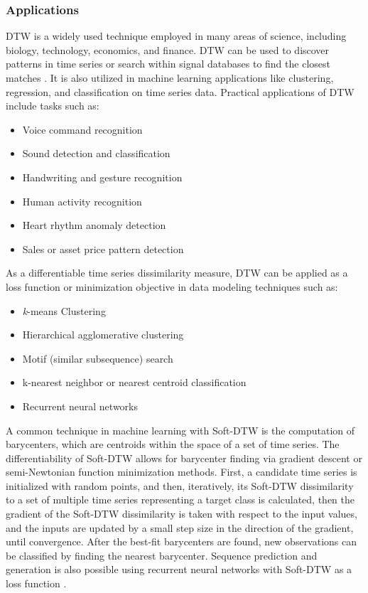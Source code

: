 \documentclass[12pt, letterpaper]{article}
\begin{document}
\subsubsection{Applications}

DTW is a widely used technique employed in many areas of science, including
biology, technology, economics, and finance. DTW can be used to discover
patterns in time series or search within signal databases to find the closest
matches \cite{keogh_derivative_2001}. It is also utilized in machine learning
applications like clustering, regression, and classification on time series
data. Practical applications of DTW include tasks such as:

\begin{itemize}
    \item Voice command recognition
    \item Sound detection and classification
    \item Handwriting and gesture recognition
    \item Human activity recognition
    \item Heart rhythm anomaly detection
    \item Sales or asset price pattern detection
\end{itemize}

As a differentiable time series dissimilarity measure, DTW can be applied as a
loss function or minimization objective in data modeling techniques such as:

\begin{itemize}
  \item \emph{k}-means Clustering
  \item Hierarchical agglomerative clustering
  \item Motif (similar subsequence) search
  \item k-nearest neighbor or nearest centroid classification
  \item Recurrent neural networks
\end{itemize}

A common technique in machine learning with Soft-DTW is the computation of
barycenters, which are centroids within the space of a set of time series. The
differentiability of Soft-DTW allows for barycenter finding via gradient descent
or semi-Newtonian function minimization methods. First, a candidate time series
is initialized with random points, and then, iteratively, its Soft-DTW
dissimilarity to a set of multiple time series representing a target class is
calculated, then the gradient of the Soft-DTW dissimilarity is taken with
respect to the input values, and the inputs are updated by a small step size in
the direction of the gradient, until convergence. After the best-fit barycenters
are found, new observations can be classified by finding the nearest barycenter.
Sequence prediction and generation is also possible using recurrent neural
networks with Soft-DTW as a loss function \cite{cuturi_soft-dtw_2018}.
\end{document}
